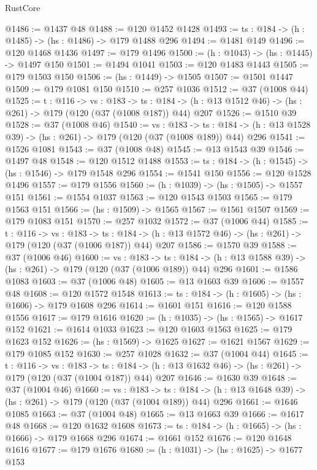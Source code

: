 \begin{lexlean}{RustCore}
\begin{coremodule}
@1486 := @1437 @48
@1488 := @120 @1452 @1428
@1493 := {ts : @184} -> (h : @1485) -> (hs : @1486) -> @179 @1488 @296
@1494 := @1481 @149
@1496 := @120 @1468 @1436
@1497 := @179 @1496
@1500 := (h : @1043) -> (hs : @1445) -> @1497 @150
@1501 := @1494 @1041
@1503 := @120 @1483 @1443
@1505 := @179 @1503 @150
@1506 := (hs : @1449) -> @1505
@1507 := @1501 @1447
@1509 := @179 @1081 @150
@1510 := @257 @1036
@1512 := @37 (@1008 @44)
@1525 := {t : @116} ->
  {vs : @183} ->
  {ts : @184} -> (h : @13 @1512 @46) -> (hs : @261) -> @179 (@120 (@37 (@1008 @187)) @44) @207
@1526 := @1510 @39
@1528 := @37 (@1008 @46)
@1540 := {vs : @183} ->
  {ts : @184} -> (h : @13 @1528 @39) -> (hs : @261) -> @179 (@120 (@37 (@1008 @189)) @44) @296
@1541 := @1526 @1081
@1543 := @37 (@1008 @48)
@1545 := @13 @1543 @39
@1546 := @1497 @48
@1548 := @120 @1512 @1488
@1553 := {ts : @184} -> (h : @1545) -> (hs : @1546) -> @179 @1548 @296
@1554 := @1541 @150
@1556 := @120 @1528 @1496
@1557 := @179 @1556
@1560 := (h : @1039) -> (hs : @1505) -> @1557 @151
@1561 := @1554 @1037
@1563 := @120 @1543 @1503
@1565 := @179 @1563 @151
@1566 := (hs : @1509) -> @1565
@1567 := @1561 @1507
@1569 := @179 @1083 @151
@1570 := @257 @1032
@1572 := @37 (@1006 @44)
@1585 := {t : @116} ->
  {vs : @183} ->
  {ts : @184} -> (h : @13 @1572 @46) -> (hs : @261) -> @179 (@120 (@37 (@1006 @187)) @44) @207
@1586 := @1570 @39
@1588 := @37 (@1006 @46)
@1600 := {vs : @183} ->
  {ts : @184} -> (h : @13 @1588 @39) -> (hs : @261) -> @179 (@120 (@37 (@1006 @189)) @44) @296
@1601 := @1586 @1083
@1603 := @37 (@1006 @48)
@1605 := @13 @1603 @39
@1606 := @1557 @48
@1608 := @120 @1572 @1548
@1613 := {ts : @184} -> (h : @1605) -> (hs : @1606) -> @179 @1608 @296
@1614 := @1601 @151
@1616 := @120 @1588 @1556
@1617 := @179 @1616
@1620 := (h : @1035) -> (hs : @1565) -> @1617 @152
@1621 := @1614 @1033
@1623 := @120 @1603 @1563
@1625 := @179 @1623 @152
@1626 := (hs : @1569) -> @1625
@1627 := @1621 @1567
@1629 := @179 @1085 @152
@1630 := @257 @1028
@1632 := @37 (@1004 @44)
@1645 := {t : @116} ->
  {vs : @183} ->
  {ts : @184} -> (h : @13 @1632 @46) -> (hs : @261) -> @179 (@120 (@37 (@1004 @187)) @44) @207
@1646 := @1630 @39
@1648 := @37 (@1004 @46)
@1660 := {vs : @183} ->
  {ts : @184} -> (h : @13 @1648 @39) -> (hs : @261) -> @179 (@120 (@37 (@1004 @189)) @44) @296
@1661 := @1646 @1085
@1663 := @37 (@1004 @48)
@1665 := @13 @1663 @39
@1666 := @1617 @48
@1668 := @120 @1632 @1608
@1673 := {ts : @184} -> (h : @1665) -> (hs : @1666) -> @179 @1668 @296
@1674 := @1661 @152
@1676 := @120 @1648 @1616
@1677 := @179 @1676
@1680 := (h : @1031) -> (hs : @1625) -> @1677 @153

\end{coremodule}
\end{lexlean}
